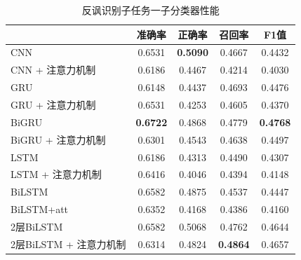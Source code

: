 \begin{table}[htb]
  \centering
  \begin{minipage}[t]{0.8\linewidth}
  \caption{反讽识别子任务一子分类器性能}
  \label{tab:exp_irony_det_B_result}
    \begin{tabularx}{\linewidth}{X|cccc}
    \toprule[1.5pt]
    & 准确率 & 正确率 & 召回率 & F1值 \\
    \hline
    CNN & 0.6531 & \bf 0.5090 & 0.4667 & 0.4432 \\ %
    CNN + 注意力机制 & 0.6186 & 0.4467 & 0.4214 & 0.4030 \\ %
    \hline
    GRU & 0.6148 & 0.4437 & 0.4693 & 0.4476 \\ %
    GRU + 注意力机制 & 0.6531 & 0.4253 & 0.4605 & 0.4370 \\ %
    \hline
    BiGRU & \bf 0.6722 & 0.4868 & 0.4779 & \bf 0.4768 \\ %
    BiGRU + 注意力机制 & 0.6301 & 0.4543 & 0.4638 & 0.4497 \\ %
    \hline
    LSTM & 0.6186 & 0.4313 & 0.4490 & 0.4307 \\ %
    LSTM + 注意力机制 & 0.6416 & 0.4046 & 0.4394 & 0.4148 \\ %
    \hline
    BiLSTM & 0.6582 & 0.4875 & 0.4537 & 0.4447 \\ %
    BiLSTM+att & 0.6352 & 0.4168 & 0.4386 & 0.4160 \\ %
    \hline
    2层BiLSTM & 0.6582 & 0.5068 & 0.4762 & 0.4644 \\ %
    2层BiLSTM + 注意力机制 & 0.6314 & 0.4824 & \bf 0.4864 & 0.4657 \\ %
    \bottomrule[1.5pt]
    \end{tabularx}
  \end{minipage}
\end{table}

